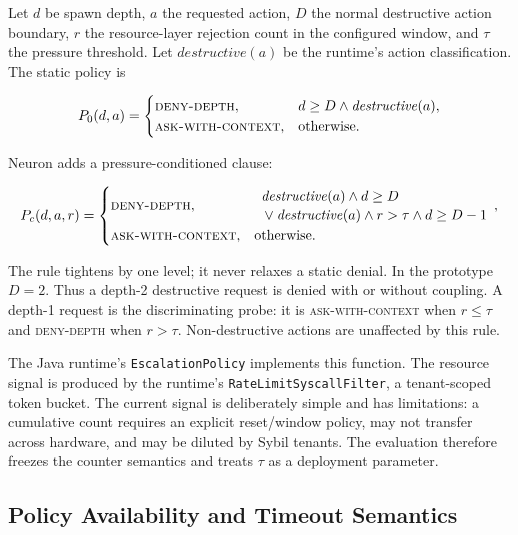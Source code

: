 Let $d$ be spawn depth, $a$ the requested action, $D$ the normal destructive
action boundary, $r$ the resource-layer rejection count in the configured
window, and $\tau$ the pressure threshold. Let
$\mathit{destructive}(a)$ be the runtime's action classification. The static
policy is

\begin{equation}
P_0(d,a)=
\begin{cases}
\textsc{deny-depth}, & d \ge D \land \mathit{destructive}(a),\\
\textsc{ask-with-context}, & \text{otherwise}.
\end{cases}
\end{equation}

Neuron adds a pressure-conditioned clause:

\begin{equation}
P_c(d,a,r)=
\begin{cases}
\textsc{deny-depth}, & \begin{array}{l}
  \mathit{destructive}(a)\land d\ge D\\[-1pt]
  {}\lor\mathit{destructive}(a)\land r>\tau\land d\ge D-1
\end{array},\\
\textsc{ask-with-context}, & \text{otherwise}.
\end{cases}
\end{equation}

The rule tightens by one level; it never relaxes a static denial. In the
prototype $D=2$. Thus a depth-2 destructive request is denied with or without
coupling. A depth-1 request is the discriminating probe: it is
\textsc{ask-with-context} when $r\le\tau$ and \textsc{deny-depth} when
$r>\tau$. Non-destructive actions are unaffected by this rule.

The Java runtime's \texttt{EscalationPolicy} implements this function. The
resource signal is produced by the runtime's
\texttt{RateLimitSyscallFilter}, a tenant-scoped token bucket. The current
signal is deliberately simple and has limitations: a cumulative count
requires an explicit reset/window policy, may not transfer across hardware,
and may be diluted by Sybil tenants. The evaluation therefore freezes the
counter semantics and treats $\tau$ as a deployment parameter.

\subsection{Policy Availability and Timeout Semantics}

